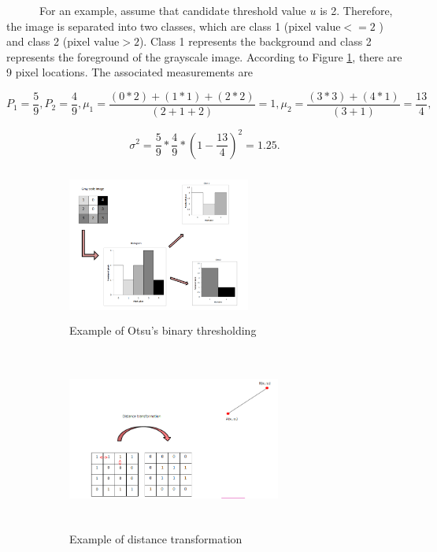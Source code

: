 \documentclass{article}
\begin{document}
~~~~~~For an example, assume that candidate threshold value \(u\) is 2.
Therefore, the image is separated into two classes, which are class 1
(\(\text{pixel value} <= 2\) ) and class 2 (\(\text{pixel value} > 2\)).
Class 1 represents the background and class 2 represents the foreground
of the grayscale image. According to Figure \ref{fig:otsu}, there are 9
pixel locations. The associated measurements are

\[P_1 = \frac{5}{9}, P_2 = \frac{4}{9}, \mu_1 = \frac{(0*2) +(1*1) + (2*2)}{(2+1+2)} = 1, \mu_2 = \frac{(3*3) +(4*1)}{(3+1)} = \frac{13}{4},\]

\[\sigma^2 = \frac{5}{9} * \frac{4}{9} * (1-\frac{13}{4})^2 = 1.25.\]

\begin{figure}[!ht]
\begin{subfigure}{.5\textwidth}
\centering
        \includegraphics[width=60mm, height=50mm]{./Figures/otsu.png}
        \caption{\label{fig:otsu}Example of Otsu's binary thresholding}
        
\end{subfigure} 
\begin{subfigure}{.5\textwidth}
\centering
        \includegraphics[width=70mm, height=60mm]{./Figures/rst.png}
        \caption{\label{fig:rstex}Example of distance transformation}
        
\end{subfigure} 

\caption{}
        \end{figure}
\end{document}

